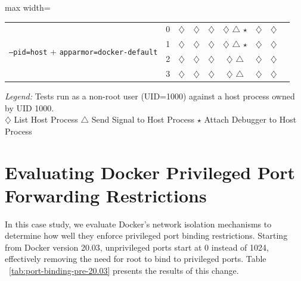 \documentclass[12pt]{report}
\begin{document}
\begin{doublespace}
\begin{table}[!h]
\begin{adjustbox}{max width=\textwidth}
\begin{tabular}{|l|c|c|c|c|c|c|c|c|}
        \multirow{4}{*}{\texttt{--pid=host} + \texttt{apparmor=docker-default}} 
            & 0 & $\diamondsuit$ & $\diamondsuit$ & $\diamondsuit$ & $\diamondsuit$ $\triangle$ $\star$ & $\diamondsuit$ & $\diamondsuit$ \\
            & 1 & $\diamondsuit$ & $\diamondsuit$ & $\diamondsuit$ & $\diamondsuit$ $\triangle$ $\star$ & $\diamondsuit$ & $\diamondsuit$ \\
            & 2 & $\diamondsuit$ & $\diamondsuit$ & $\diamondsuit$ & $\diamondsuit$ $\triangle$ & $\diamondsuit$ & $\diamondsuit$ \\
            & 3 & $\diamondsuit$ & $\diamondsuit$ & $\diamondsuit$ & $\diamondsuit$ $\triangle$ & $\diamondsuit$ & $\diamondsuit$ \\
        \hline
    \end{tabular}
    \end{adjustbox}
    \textit{Legend:}{
        Tests run as a non-root user (UID=1000) against a host process owned by UID 1000.\\
        $\diamondsuit$ List Host Process \quad 
        $\triangle$ Send Signal to Host Process \quad 
        $\star$ Attach Debugger to Host Process
    }
\end{table}
























\section{Evaluating Docker Privileged Port Forwarding Restrictions}

In this case study, we evaluate Docker's network isolation mechanisms to determine how well they enforce privileged port binding restrictions. Starting from Docker version 20.03, unprivileged ports start at 0 instead of 1024, effectively removing the need for root to bind to privileged ports. Table ~\ref{tab:port-binding-pre-20.03} presents the results of this change.


\end{doublespace}
\end{document}
